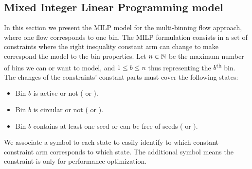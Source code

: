 \subsection{Mixed Integer Linear Programming model}

In this section we present the MILP model for the multi-binning flow approach, where one flow corresponds to one bin.
The MILP formulation consists in a set of constraints where the right inequality constant arm can change to make correspond the model to the bin properties.
Let \(n \in \mathbb{N}{}\) be the maximum number of bins we can or want to model, and \(1 \leq b \leq n\) thus representing the \(b\)\textsuperscript{th} bin.
The changes of the constraints' constant parts must cover the following states:

\begin{itemize}
  \item Bin \(b\) is active or not (\mfbOn{} or \mfbOff{}).
  \item Bin \(b\) is circular or not (\mfbC{} or \mfbPC{}).
  \item Bin \(b\) contains at least one seed or can be free of seeds (\mfbS{} or \mfbFS{}).
\end{itemize}

We associate a symbol to each state to easily identify to which constant constraint arm corresponds to which state.
The additional symbol \mfbOpti{} means the constraint is only for performance optimization.

